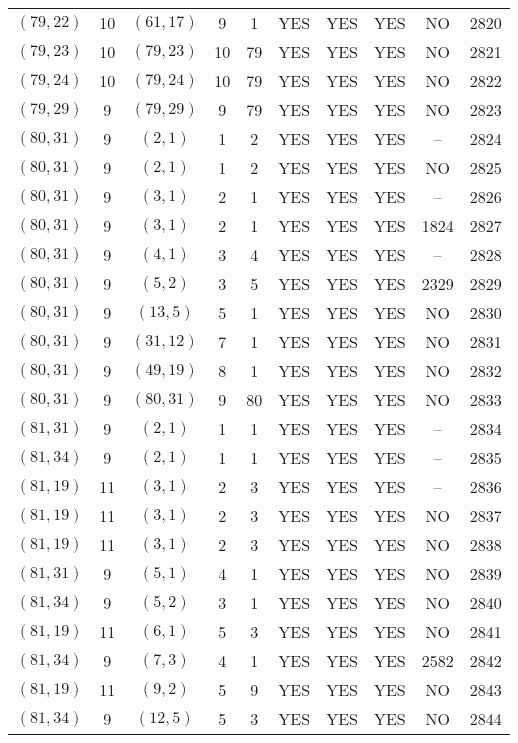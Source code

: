 \begin{longtable}{|c|c|c|c|c|c|c|c|c|c|}
$(79, 22)$ & 10 & $(61, 17)$ & 9 & 1 & YES & YES & YES & NO & 2820\\
$(79, 23)$ & 10 & $(79, 23)$ & 10 & 79 & YES & YES & YES & NO & 2821\\
$(79, 24)$ & 10 & $(79, 24)$ & 10 & 79 & YES & YES & YES & NO & 2822\\
$(79, 29)$ & 9 & $(79, 29)$ & 9 & 79 & YES & YES & YES & NO & 2823\\
$(80, 31)$ & 9 & $(2, 1)$ & 1 & 2 & YES & YES & YES & -- & 2824\\
$(80, 31)$ & 9 & $(2, 1)$ & 1 & 2 & YES & YES & YES & NO & 2825\\
$(80, 31)$ & 9 & $(3, 1)$ & 2 & 1 & YES & YES & YES & -- & 2826\\
$(80, 31)$ & 9 & $(3, 1)$ & 2 & 1 & YES & YES & YES & 1824 & 2827\\
$(80, 31)$ & 9 & $(4, 1)$ & 3 & 4 & YES & YES & YES & -- & 2828\\
$(80, 31)$ & 9 & $(5, 2)$ & 3 & 5 & YES & YES & YES & 2329 & 2829\\
$(80, 31)$ & 9 & $(13, 5)$ & 5 & 1 & YES & YES & YES & NO & 2830\\
$(80, 31)$ & 9 & $(31, 12)$ & 7 & 1 & YES & YES & YES & NO & 2831\\
$(80, 31)$ & 9 & $(49, 19)$ & 8 & 1 & YES & YES & YES & NO & 2832\\
$(80, 31)$ & 9 & $(80, 31)$ & 9 & 80 & YES & YES & YES & NO & 2833\\
$(81, 31)$ & 9 & $(2, 1)$ & 1 & 1 & YES & YES & YES & -- & 2834\\
$(81, 34)$ & 9 & $(2, 1)$ & 1 & 1 & YES & YES & YES & -- & 2835\\
$(81, 19)$ & 11 & $(3, 1)$ & 2 & 3 & YES & YES & YES & -- & 2836\\
$(81, 19)$ & 11 & $(3, 1)$ & 2 & 3 & YES & YES & YES & NO & 2837\\
$(81, 19)$ & 11 & $(3, 1)$ & 2 & 3 & YES & YES & YES & NO & 2838\\
$(81, 31)$ & 9 & $(5, 1)$ & 4 & 1 & YES & YES & YES & NO & 2839\\
$(81, 34)$ & 9 & $(5, 2)$ & 3 & 1 & YES & YES & YES & NO & 2840\\
$(81, 19)$ & 11 & $(6, 1)$ & 5 & 3 & YES & YES & YES & NO & 2841\\
$(81, 34)$ & 9 & $(7, 3)$ & 4 & 1 & YES & YES & YES & 2582 & 2842\\
$(81, 19)$ & 11 & $(9, 2)$ & 5 & 9 & YES & YES & YES & NO & 2843\\
$(81, 34)$ & 9 & $(12, 5)$ & 5 & 3 & YES & YES & YES & NO & 2844\\

\end{longtable}
